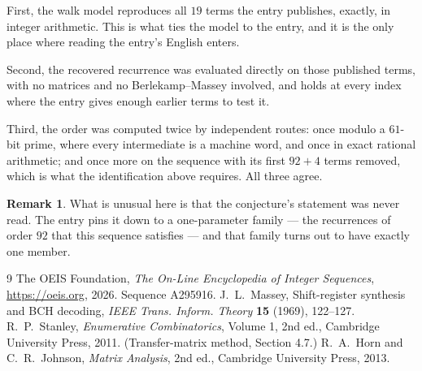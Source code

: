 \documentclass[11pt,a4paper]{article}
\theoremstyle{plain}
\theoremstyle{definition}
\newtheorem{remark}[theorem]{Remark}
\begin{document}
First, the walk model reproduces all $19$ terms the entry publishes, exactly, in integer
arithmetic. This is what ties the model to the entry, and it is the only place where reading
the entry's English enters.

Second, the recovered recurrence was evaluated directly on those published terms, with no
matrices and no Berlekamp--Massey involved, and holds at every index where the entry gives
enough earlier terms to test it.

Third, the order was computed twice by independent routes: once modulo a $61$-bit prime, where
every intermediate is a machine word, and once in exact rational arithmetic; and once more on
the sequence with its first $92+4$ terms removed, which is what the identification above
requires. All three agree.

\begin{remark}
What is unusual here is that the conjecture's statement was never read. The entry pins it down
to a one-parameter family --- the recurrences of order $92$ that this sequence satisfies
--- and that family turns out to have exactly one member.
\end{remark}

\begin{thebibliography}{9}
 The OEIS Foundation, \emph{The On-Line Encyclopedia of Integer
Sequences}, \url{https://oeis.org}, 2026. Sequence A295916.
 J.~L.~Massey, Shift-register synthesis and BCH decoding, \emph{IEEE
Trans. Inform. Theory} \textbf{15} (1969), 122--127.
 R.~P.~Stanley, \emph{Enumerative Combinatorics}, Volume 1, 2nd ed.,
Cambridge University Press, 2011. (Transfer-matrix method, Section 4.7.)
 R.~A.~Horn and C.~R.~Johnson, \emph{Matrix Analysis}, 2nd ed., Cambridge
University Press, 2013.
\end{thebibliography}
\end{document}
